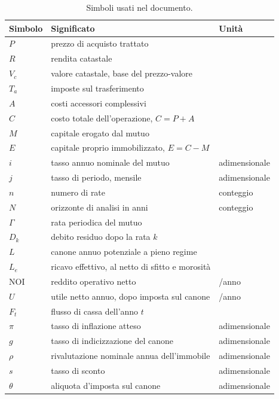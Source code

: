 \documentclass[11pt,a4paper]{article}
\theoremstyle{definition}
\theoremstyle{plain}
\newcommand{\euro}{\texteuro}
\begin{document}
\begin{table}[H]
\centering
\small
\begin{tabular}{@{}lll@{}}
\toprule
Simbolo & Significato & Unità \\
\midrule
$P$ & prezzo di acquisto trattato & \euro \\
$R$ & rendita catastale & \euro \\
$V_c$ & valore catastale, base del prezzo-valore & \euro \\
$T_a$ & imposte sul trasferimento & \euro \\
$A$ & costi accessori complessivi & \euro \\
$C$ & costo totale dell'operazione, $C = P + A$ & \euro \\
$M$ & capitale erogato dal mutuo & \euro \\
$E$ & capitale proprio immobilizzato, $E = C - M$ & \euro \\
$i$ & tasso annuo nominale del mutuo & adimensionale \\
$j$ & tasso di periodo, mensile & adimensionale \\
$n$ & numero di rate & conteggio \\
$N$ & orizzonte di analisi in anni & conteggio \\
$\Gamma$ & rata periodica del mutuo & \euro \\
$D_k$ & debito residuo dopo la rata $k$ & \euro \\
$L$ & canone annuo potenziale a pieno regime & \euro \\
$L_e$ & ricavo effettivo, al netto di sfitto e morosità & \euro \\
$\mathrm{NOI}$ & reddito operativo netto & \euro/anno \\
$U$ & utile netto annuo, dopo imposta sul canone & \euro/anno \\
$F_t$ & flusso di cassa dell'anno $t$ & \euro \\
$\pi$ & tasso di inflazione atteso & adimensionale \\
$g$ & tasso di indicizzazione del canone & adimensionale \\
$\rho$ & rivalutazione nominale annua dell'immobile & adimensionale \\
$s$ & tasso di sconto & adimensionale \\
$\theta$ & aliquota d'imposta sul canone & adimensionale \\
\bottomrule
\end{tabular}
\caption{Simboli usati nel documento.}
\end{table}
\end{document}
